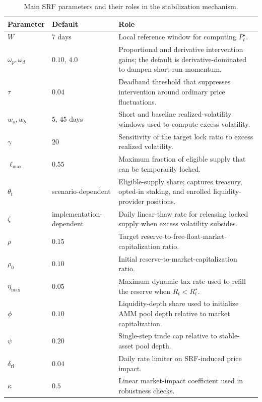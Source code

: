 \documentclass[a4paper,fleqn]{cas-dc}
\begin{document}
\begin{table}[htbp]
\centering
\caption{Main SRF parameters and their roles in the stabilization mechanism.}
\label{tab:method_parameters}
\begin{tabular}{|p{2.8cm}|p{2.4cm}|p{9.0cm}|}
\hline
\textbf{Parameter} & \textbf{Default} & \textbf{Role} \\
\hline
$W$ & 7 days & Local reference window for computing $P_t^{\star}$. \\
\hline
$\omega_p,\omega_d$ & $0.10,\,4.0$ & Proportional and derivative intervention gains; the default is derivative-dominated to dampen short-run momentum. \\
\hline
$\tau$ & $0.04$ & Deadband threshold that suppresses intervention around ordinary price fluctuations. \\
\hline
$w_s,w_b$ & $5,\,45$ days & Short and baseline realized-volatility windows used to compute excess volatility. \\
\hline
$\gamma$ & $20$ & Sensitivity of the target lock ratio to excess realized volatility. \\
\hline
$\ell_{\max}$ & $0.55$ & Maximum fraction of eligible supply that can be temporarily locked. \\
\hline
$\theta_t$ & scenario-dependent & Eligible-supply share; captures treasury, opted-in staking, and enrolled liquidity-provider positions. \\
\hline
$\zeta$ & implementation-dependent & Daily linear-thaw rate for releasing locked supply when excess volatility subsides. \\
\hline
$\rho$ & $0.15$ & Target reserve-to-free-float-market-capitalization ratio. \\
\hline
$\rho_0$ & $0.10$ & Initial reserve-to-market-capitalization ratio. \\
\hline
$\eta_{\max}$ & $0.05$ & Maximum dynamic tax rate used to refill the reserve when $R_t<R_t^{\star}$. \\
\hline
$\phi$ & $0.10$ & Liquidity-depth share used to initialize AMM pool depth relative to market capitalization. \\
\hline
$\psi$ & $0.20$ & Single-step trade cap relative to stable-asset pool depth. \\
\hline
$\delta_{\mathrm{rl}}$ & $0.04$ & Daily rate limiter on SRF-induced price impact. \\
\hline
$\kappa$ & $0.5$ & Linear market-impact coefficient used in robustness checks. \\
\hline
\end{tabular}
\end{table}
\end{document}
